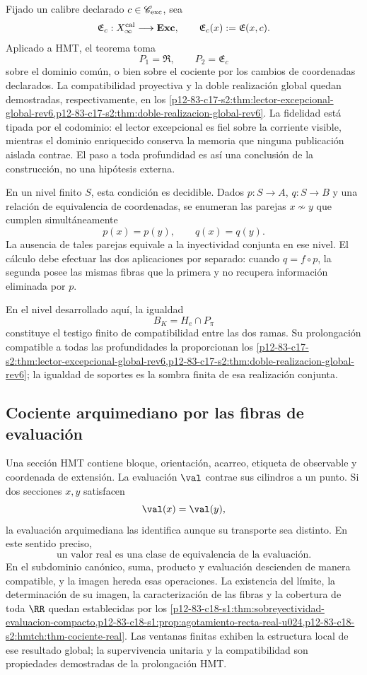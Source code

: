 Fijado un calibre declarado \(c\in\mathscr C_{\rm exc}\), sea
\[
 \mathfrak E_c:X_\infty^{\rm cal}\longrightarrow\mathbf{Exc},
 \qquad
 \mathfrak E_c(x):=\mathfrak E(x,c).
\]
Aplicado a HMT, el teorema toma
\[
 P_1=\mathfrak R,\qquad P_2=\mathfrak E_c
\]
sobre el dominio común, o bien sobre el cociente por los cambios de
coordenadas declarados. La compatibilidad proyectiva y la doble realización
global quedan demostradas, respectivamente, en los
\cref{p12-83-c17-s2:thm:lector-excepcional-global-rev6,p12-83-c17-s2:thm:doble-realizacion-global-rev6}.
La fidelidad está tipada por el codominio: el lector excepcional es fiel sobre
la corriente visible, mientras el dominio enriquecido conserva la memoria que
ninguna publicación aislada contrae. El paso a toda profundidad es así una
conclusión de la construcción, no una hipótesis externa.

En un nivel finito \(S\), esta condición es decidible. Dados
\(p:S\to A\), \(q:S\to B\) y una relación de equivalencia de coordenadas,
se enumeran las parejas \(x\not\sim y\) que cumplen simultáneamente
\[
 p(x)=p(y),\qquad q(x)=q(y).
\]
La ausencia de tales parejas equivale a la inyectividad conjunta en ese
nivel. El cálculo debe efectuar las dos aplicaciones por separado: cuando
\(q=f\circ p\), la segunda posee las mismas fibras que la primera y no
recupera información eliminada por \(p\).

En el nivel desarrollado aquí, la igualdad
\[
 B_K=H_e\cap P_\pi
\]
constituye el testigo finito de compatibilidad entre las dos ramas. Su
prolongación compatible a todas las profundidades la proporcionan los
\cref{p12-83-c17-s2:thm:lector-excepcional-global-rev6,p12-83-c17-s2:thm:doble-realizacion-global-rev6};
la igualdad de soportes es la sombra finita de esa realización conjunta.

\subsection{Cociente arquimediano por las fibras de evaluación}

Una sección HMT contiene bloque, orientación, acarreo, etiqueta de observable
y coordenada de extensión. La
evaluación \(\val\) contrae sus cilindros a un punto. Si dos secciones
\(x,y\) satisfacen
\[
\val(x)=\val(y),
\]
la evaluación arquimediana las identifica aunque su transporte sea distinto. En
este sentido preciso,
\[
\boxed{\text{un valor real es una clase de equivalencia de la evaluación}.}
\]
En el subdominio canónico, suma, producto y evaluación descienden de manera
compatible, y la imagen hereda esas operaciones. La existencia del límite, la
determinación de su imagen, la caracterización de las fibras y la cobertura de
toda \(\RR\) quedan establecidas por los
\cref{p12-83-c18-s1:thm:sobreyectividad-evaluacion-compacto,p12-83-c18-s1:prop:agotamiento-recta-real-u024,p12-83-c18-s2:hmtch:thm-cociente-real}.
Las ventanas finitas exhiben la estructura local de ese resultado global; la
supervivencia unitaria y la compatibilidad son propiedades demostradas de la
prolongación HMT.

